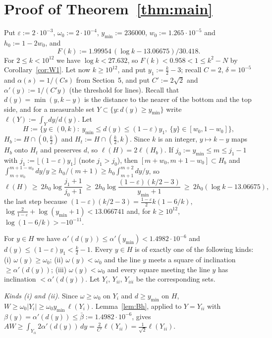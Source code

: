 \documentclass[11pt]{amsart}
\theoremstyle{definition}
\theoremstyle{remark}
\newcommand{\frc}[1]{\{#1\}}
\begin{document}
\section{Proof of Theorem~\ref{thm:main}}

Put $\varepsilon:=2\cdot10^{-3}$, $\omega_0:=2\cdot10^{-4}$, $y_{\min}:=236000$, $w_0:=1.265\cdot10^{-5}$ and $h_0:=1-2w_0$, and
\[
F(k):=1.99954\,(\log k-13.06675)/30.418 .
\]
For $2\le k<10^{12}$ we have $\log k<27.632$, so $F(k)<0.958<1\le k^2-N$ by Corollary~\ref{cor:W1}. Let now
$k\ge10^{12}$, and put $y_1:=\frac k2-3$; recall $C=2$, $\delta=10^{-5}$ and $\alpha(s)=1/(Cs)$ from Section~5, and put
$C':=2\sqrt2$ and $\alpha'(y):=1/(C'y)$ (the threshold for lines). Recall that $d(y)=\min(y,k-y)$ is the distance to the
nearer of the bottom and the top side, and for a measurable set $Y\subset\{y:d(y)\ge y_{\min}\}$ write $\ell(Y):=\int_Ydy/d(y)$. Let
\[
H:=\{y\in(0,k):\ y_{\min}\le d(y)\le(1-\varepsilon)y_1,\ \frc{y}\in[w_0,1-w_0]\},
\]
$H_b:=H\cap(0,\frac k2)$ and $H_t:=H\cap(\frac k2,k)$.
Since $k$ is an integer, $y\mapsto k-y$ maps $H_b$ onto $H_t$ and preserves $d$, so $\ell(H)=2\ell(H_b)$. If
$j_0:=y_{\min}\le m\le j_1-1$ with $j_1:=\lfloor(1-\varepsilon)y_1\rfloor$ (note $j_1>j_0$), then $[m+w_0,m+1-w_0]\subset H_b$ and
$\int_{m+w_0}^{m+1-w_0}dy/y\ge h_0/(m+1)\ge h_0\int_{m+1}^{m+2}dy/y$, so
\[
\ell(H)\ \ge\ 2h_0\log\frac{j_1+1}{j_0+1}\ \ge\ 2h_0\log\frac{(1-\varepsilon)(k/2-3)}{y_{\min}+1}\ \ge\ 2h_0(\log k-13.06675),
\]
the last step because $(1-\varepsilon)(k/2-3)=\frac{1-\varepsilon}2k(1-6/k)$, $\log\frac2{1-\varepsilon}+\log(y_{\min}+1)<13.066741$ and, for
$k\ge10^{12}$, $\log(1-6/k)>-10^{-11}$.

For $y\in H$ we have $\alpha'(d(y))\le\alpha'(y_{\min})<1.4982\cdot10^{-6}$ and $d(y)\le(1-\varepsilon)y_1<\frac k2-1$.
Every $y\in H$ is of exactly one of the following kinds: (i) $\omega(y)\ge\omega_0$; (ii) $\omega(y)<\omega_0$ and the line $y$ meets a
square of inclination $\ge\alpha'(d(y))$; (iii) $\omega(y)<\omega_0$ and every square meeting the line $y$ has inclination
$<\alpha'(d(y))$. Let $Y_i$, $Y_{ii}$, $Y_{iii}$ be the corresponding sets.

\smallskip\noindent\emph{Kinds (i) and (ii).} Since $\omega\ge\omega_0$ on $Y_i$ and $d\ge y_{\min}$ on $H$,
$W\ge\omega_0|Y_i|\ge\omega_0y_{\min}\,\ell(Y_i)$. Lemma~\ref{lem:Bh}, applied to $Y=Y_{ii}$ with $\beta(y)=\alpha'(d(y))\le\bar\beta:=1.4982\cdot10^{-6}$,
gives $AW\ge\int_{Y_{ii}}2\alpha'(d(y))\,dy=\frac2{C'}\ell(Y_{ii})=\frac1{\sqrt2}\ell(Y_{ii})$.
\end{document}
